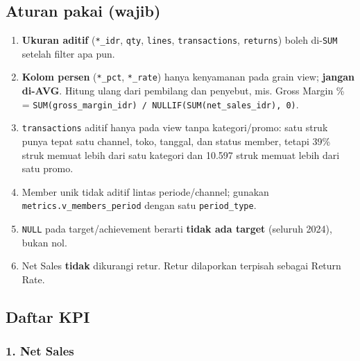 \documentclass[10pt,a4paper]{article}
\providecommand{\tightlist}{\setlength{\itemsep}{1pt}\setlength{\parskip}{0pt}}
\begin{document}
\subsection{Aturan pakai (wajib)}\label{aturan-pakai-wajib}

\begin{enumerate}
\def\labelenumi{\arabic{enumi}.}
\tightlist
\item
  \textbf{Ukuran aditif} (\texttt{*\_\allowbreak{}idr}, \texttt{qty}, \texttt{lines}, \texttt{transactions}, \texttt{returns}) boleh di-\texttt{SUM} setelah filter apa pun.
\item
  \textbf{Kolom persen} (\texttt{*\_\allowbreak{}pct}, \texttt{*\_\allowbreak{}rate}) hanya kenyamanan pada grain view; \textbf{jangan di-AVG}. Hitung ulang dari pembilang dan penyebut,
  mis. Gross Margin \% = \texttt{SUM(gross\_\allowbreak{}margin\_\allowbreak{}idr)\ /\ NULLIF(SUM(net\_\allowbreak{}sales\_\allowbreak{}idr),\ 0)}.
\item
  \texttt{transactions} aditif hanya pada view tanpa kategori/promo: satu struk punya tepat satu channel, toko, tanggal, dan status member,
  tetapi 39\% struk memuat lebih dari satu kategori dan 10.597 struk memuat lebih dari satu promo.
\item
  Member unik tidak aditif lintas periode/channel; gunakan \texttt{metrics.v\_\allowbreak{}members\_\allowbreak{}period} dengan satu \texttt{period\_\allowbreak{}type}.
\item
  \texttt{NULL} pada target/achievement berarti \textbf{tidak ada target} (seluruh 2024), bukan nol.
\item
  Net Sales \textbf{tidak} dikurangi retur. Retur dilaporkan terpisah sebagai Return Rate.
\end{enumerate}

\subsection{Daftar KPI}\label{daftar-kpi}

\subsubsection{1. Net Sales}\label{net-sales}
\end{document}
